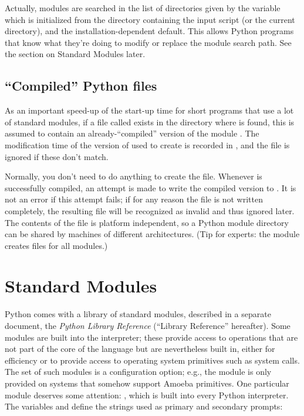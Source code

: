 \documentclass{manual}
\begin{document}
Actually, modules are searched in the list of directories given by the 
variable  which is initialized from the directory 
containing the input script (or the current directory),
 and the installation-dependent default.  This allows
Python programs that know what they're doing to modify or replace the 
module search path.  See the section on Standard Modules later.

\subsection{``Compiled'' Python files}

As an important speed-up of the start-up time for short programs that
use a lot of standard modules, if a file called  exists
in the directory where  is found, this is assumed to
contain an already-``compiled'' version of the module .
The modification time of the version of  used to create
 is recorded in , and the file is
ignored if these don't match.

Normally, you don't need to do anything to create the  file.
Whenever  is successfully compiled, an attempt is made to
write the compiled version to .  It is not an error if
this attempt fails; if for any reason the file is not written
completely, the resulting  file will be recognized as
invalid and thus ignored later.  The contents of the 
file is platform independent, so a Python module directory can be
shared by machines of different architectures.  (Tip for experts:
the module  creates
 files for all modules.)


\section{Standard Modules}
\label{standardModules}

Python comes with a library of standard modules, described in a separate
document, the \emph{Python Library Reference} (``Library Reference''
hereafter).  Some modules are built into the interpreter; these
provide access to operations that are not part of the core of the
language but are nevertheless built in, either for efficiency or to
provide access to operating system primitives such as system calls.
The set of such modules is a configuration option; e.g., the
 module is  only provided on systems that somehow
support Amoeba primitives.  One particular module deserves some
attention: , which is built into every
Python interpreter.  The variables  and 
define the strings used as primary and secondary prompts:
\end{document}
